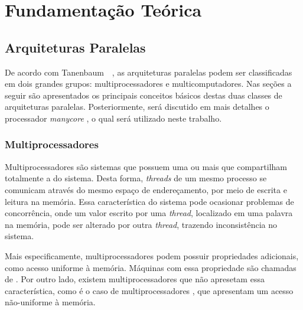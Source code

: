 \chapter{Fundamentação Teórica}
\label{cha:fundTeorica}

\section{Arquiteturas Paralelas}

De acordo com Tanenbaum~\etal~\cite{Tanenbaum2015}, as arquiteturas paralelas podem ser classificadas em
dois grandes grupos: multiprocessadores e multicomputadores. Nas seções a seguir são apresentados os
principais conceitos básicos destas duas classes de arquiteturas paralelas. Posteriormente, será discutido
em mais detalhes o processador \textit{manycore} \mppa, o qual será utilizado neste trabalho.


\subsection{Multiprocessadores}




Multiprocessadores são sistemas que possuem uma ou mais \cpus que compartilham totalmente
a \ram do sistema. Desta forma, \textit{threads} de um mesmo processo se
comunicam através do mesmo espaço de endereçamento, por meio de escrita e
leitura na memória. Essa característica do sistema pode ocasionar problemas de
concorrência, onde um valor escrito por uma \textit{thread}, localizado em uma
palavra na memória, pode ser alterado por outra \textit{thread}, trazendo inconsistência no
sistema.

Mais especificamente, multiprocessadores podem possuir propriedades adicionais,
como acesso uniforme à memória. Máquinas com essa propriedade são chamadas de
\uma. Por outro lado, existem multiprocessadores que não apresetam essa
característica, como é o caso de multiprocessadores \numa, que apresentam um acesso
não-uniforme à memória.

